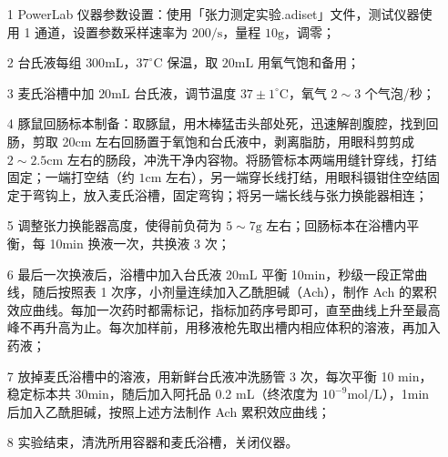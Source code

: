 \documentclass[UTF8]{ctexart}
\begin{document}
\begin{itemize}
    \item [1] PowerLab 仪器参数设置：使用「张力测定实验.adiset」文件，测试仪器使用 1 通道，设置参数采样速率为 $200/\text{s}$，量程 $10\text{g}$，调零；
    \item [2] 台氏液每组 $300\text{mL}$，$37^\circ\text{C}$ 保温，取 $20\text{mL}$ 用氧气饱和备用；
    \item [3] 麦氏浴槽中加 $20\text{mL}$ 台氏液，调节温度 $37\pm1^\circ\text{C}$，氧气 $2\sim 3$ 个气泡/秒；
    \item [4] 豚鼠回肠标本制备：取豚鼠，用木棒猛击头部处死，迅速解剖腹腔，找到回肠，剪取 20cm 左右回肠置于氧饱和台氏液中，剥离脂肪，用眼科剪剪成 $2\sim 2.5\text{cm}$ 左右的肠段，冲洗干净内容物。将肠管标本两端用缝针穿线，打结固定；一端打空结（约 $1\text{cm}$ 左右），另一端穿长线打结，用眼科镊钳住空结固定于弯钩上，放入麦氏浴槽，固定弯钩；将另一端长线与张力换能器相连；
    \item [5] 调整张力换能器高度，使得前负荷为 $5\sim 7\text{g}$ 左右；回肠标本在浴槽内平衡，每 10min 换液一次，共换液 3 次；
    \item [6] 最后一次换液后，浴槽中加入台氏液 20mL 平衡 10min，秒级一段正常曲线，随后按照表 1 次序，小剂量连续加入乙酰胆碱（Ach），制作 Ach 的累积效应曲线。每加一次药时都需标记，指标加药序号即可，直至曲线上升至最高峰不再升高为止。每次加样前，用移液枪先取出槽内相应体积的溶液，再加入药液；
    \item [7] 放掉麦氏浴槽中的溶液，用新鲜台氏液冲洗肠管 3 次，每次平衡 10 min，稳定标本共 30min，随后加入阿托品 0.2 mL（终浓度为 $10^{-9}\text{mol}/\text{L}$），1min 后加入乙酰胆碱，按照上述方法制作 Ach 累积效应曲线；
    \item [8] 实验结束，清洗所用容器和麦氏浴槽，关闭仪器。
\end{itemize}
\end{document}
